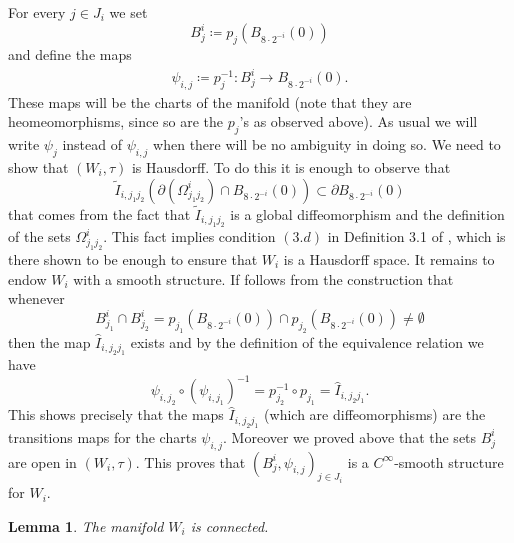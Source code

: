 \documentclass[11pt]{article}
\theoremstyle{plain}
\newtheorem{lemma}[theorem]{Lemma}
\theoremstyle{definition}
\numberwithin{equation}{section}
\begin{document}
For every $j \in J_i$ we set 
\[
B_j^i\coloneqq p_j(B_{8\cdot 2^{-i}}(0))
\]
 and define the maps 
 \begin{align*}
      \psi_{i,j}\coloneqq p_j^{-1}: B_j^i \to B_{8\cdot 2^{-i}}(0).
 \end{align*}
These maps will be the charts of the manifold (note that they are heomeomorphisms, since so are the $p_j$'s  as observed above). As usual we will write $\psi_{j}$ instead of $\psi_{i,j}$ when there will be no ambiguity in doing so.
We need to show that $(W_i,\tau)$ is Hausdorff. To do this it is enough to observe that 
\[ \widetilde I_{i,j_1j_2} (\partial (\Omega^i_{j_1j_2})\cap B_{8\cdot2^{-i}}(0)) \subset \partial B_{8\cdot2^{-i}}(0) \]
that comes from the fact that $\widetilde I_{i,j_1j_2}$ is a global diffeomorphism and the definition of the sets $\Omega^i_{j_1j_2}$. This fact implies condition $(3.d)$ in Definition 3.1 of \cite{glue}, which is there shown to be enough to ensure that $W_i$ is a Hausdorff space.
It remains to endow $W_i$ with a smooth structure. If follows from the construction that whenever 
$$B_{j_1}^i\cap B_{j_2}^i=p_{j_1}( B_{8\cdot 2^{-i}}(0))\cap p_{j_2}( B_{8\cdot 2^{-i}}(0))\neq \emptyset$$
then the map $\hat I_{i,j_2j_1}$  exists and by the definition of the equivalence relation we have
\begin{equation}\label{eq:correct transitions}
    \psi_{i,j_2} \circ (\psi_{i,j_1})^{-1}= p_{j_2}^{-1} \circ p_{j_1}=\hat I_{i,j_2j_1}.
\end{equation}
This shows precisely that the maps $\hat I_{i,j_2j_1}$ (which are  diffeomorphisms) are the transitions maps for the charts $\psi_{i,j}$.
Moreover we proved above that the sets $B_j^i$ are open in $(W_i,\tau)$. This proves that  $(B^i_j ,\psi_{i,j})_{j \in J_i}$ is a  $C^\infty$-smooth structure for $W_i.$ 
\begin{lemma}\label{connected}
	The manifold $W_i$ is connected.
\end{lemma}	
\end{document}
